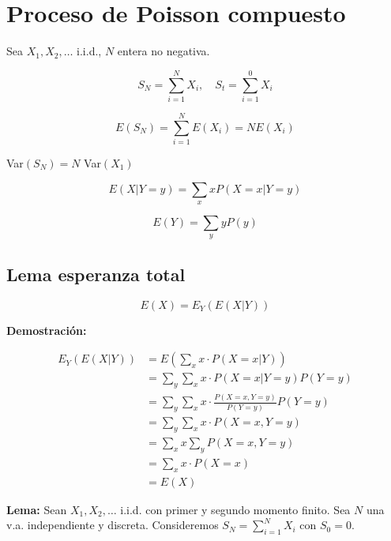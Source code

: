 \documentclass[12pt]{article}
\begin{document}




\section*{Proceso de Poisson compuesto}

Sea $X_1, X_2, \ldots$ i.i.d., $N$ entera no negativa.

\begin{equation*}
S_N = \sum_{i=1}^{N} X_i, \quad S_t = \sum_{i=1}^{0} X_i
\end{equation*}

\begin{equation*}
E(S_N) = \sum_{i=1}^{N} E(X_i) = NE(X_i)
\end{equation*}

Var$(S_N) = N$ Var$(X_1)$

\begin{equation*}
E(X|Y=y) = \sum_{x} x P(X=x|Y=y)
\end{equation*}

\begin{equation*}
E(Y) = \sum_{y} y P(y)
\end{equation*}

\subsection*{Lema esperanza total}

\begin{equation*}
E(X) = E_Y(E(X|Y))
\end{equation*}

\textbf{Demostración:}

\begin{align*}
E_Y(E(X|Y)) &= E\left(\sum_x x \cdot P(X=x|Y)\right) \\
&= \sum_y \sum_x x \cdot P(X=x|Y=y) P(Y=y) \\
&= \sum_y \sum_x x \cdot \frac{P(X=x, Y=y)}{P(Y=y)} P(Y=y) \\
&= \sum_y \sum_x x \cdot P(X=x, Y=y) \\
&= \sum_x x \sum_y P(X=x, Y=y) \\
&= \sum_x x \cdot P(X=x) \\
&= E(X)
\end{align*}

\textbf{Lema:} Sean $X_1, X_2, \ldots$ i.i.d. con primer y segundo momento finito. Sea $N$ una v.a. independiente y discreta. Consideremos $S_N = \sum_{i=1}^{N} X_i$ con $S_0 = 0$.
\end{document}
